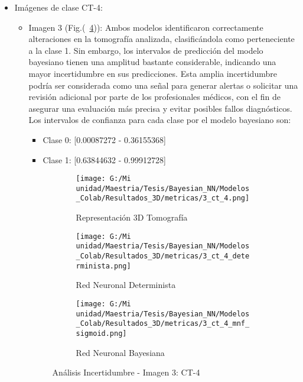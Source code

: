 \documentclass[10pt, oneside, a4paper]{article}
\begin{document}
\begin{itemize}
	\item Imágenes de clase CT-4:
	
	\begin{itemize}
	\item Imagen 3 (Fig.(~\ref{fig:layout_3})): Ambos modelos identificaron correctamente alteraciones en la tomografía analizada, clasificándola como perteneciente a la clase 1. Sin embargo, los intervalos de predicción del modelo bayesiano tienen una amplitud bastante considerable, indicando una mayor incertidumbre en sus predicciones. Esta amplia incertidumbre podría ser considerada como una señal para generar alertas o solicitar una revisión adicional por parte de los profesionales médicos, con el fin de asegurar una evaluación más precisa y evitar posibles fallos diagnósticos. 
	Los intervalos de confianza para cada clase por el modelo bayesiano son:
	\begin{itemize}
	\item Clase 0: [0.00087272 - 0.36155368] 
	\item Clase 1: [0.63844632 - 0.99912728]
	\end{itemize} 

\begin{figure}[H]
	\centering
	\begin{subfigure}[b]{0.6\textwidth}
		\centering
		\texttt{[image: G:/Mi unidad/Maestria/Tesis/Bayesian\_NN/Modelos\_Colab/Resultados\_3D/metricas/3\_ct\_4.png]} %
		\caption{Representación 3D Tomografía}
		\label{fig:3_ct4_1}
	\end{subfigure}
	
	\medskip
	
	\begin{subfigure}[b]{0.45\textwidth}
		\centering
		\texttt{[image: G:/Mi unidad/Maestria/Tesis/Bayesian\_NN/Modelos\_Colab/Resultados\_3D/metricas/3\_ct\_4\_determinista.png]}
		\caption{Red Neuronal Determinista}
		\label{fig:3_ct4_2}
	\end{subfigure}
	\hfill
	\begin{subfigure}[b]{0.45\textwidth}
		\centering
		\texttt{[image: G:/Mi unidad/Maestria/Tesis/Bayesian\_NN/Modelos\_Colab/Resultados\_3D/metricas/3\_ct\_4\_mnf\_sigmoid.png]}
		\caption{Red Neuronal Bayesiana}
		\label{fig:3_ct4_3}
	\end{subfigure}
	
	\caption{Análisis Incertidumbre - Imagen 3: CT-4}
	\label{fig:layout_3}
\end{figure}
	

\end{itemize}
\end{itemize}
\end{document}
